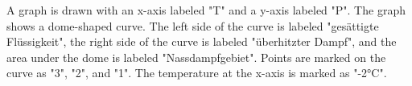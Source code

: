 A graph is drawn with an x-axis labeled "T" and a y-axis labeled "P". The graph shows a dome-shaped curve. The left side of the curve is labeled "gesättigte Flüssigkeit", the right side of the curve is labeled "überhitzter Dampf", and the area under the dome is labeled "Nassdampfgebiet". Points are marked on the curve as "3", "2", and "1". The temperature at the x-axis is marked as "-2°C".